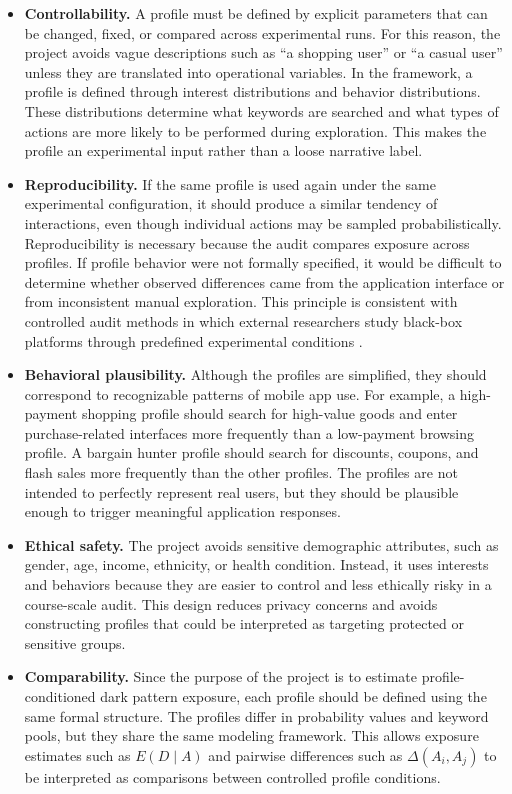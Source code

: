 \begin{itemize}
    \item \textbf{Controllability.} A profile must be defined by explicit parameters that can be changed, fixed, or compared across experimental runs. For this reason, the project avoids vague descriptions such as ``a shopping user'' or ``a casual user'' unless they are translated into operational variables. In the framework, a profile is defined through interest distributions and behavior distributions. These distributions determine what keywords are searched and what types of actions are more likely to be performed during exploration. This makes the profile an experimental input rather than a loose narrative label.

    \item \textbf{Reproducibility.} If the same profile is used again under the same experimental configuration, it should produce a similar tendency of interactions, even though individual actions may be sampled probabilistically. Reproducibility is necessary because the audit compares exposure across profiles. If profile behavior were not formally specified, it would be difficult to determine whether observed differences came from the application interface or from inconsistent manual exploration. This principle is consistent with controlled audit methods in which external researchers study black-box platforms through predefined experimental conditions \cite{sandvig2014auditing,hannak2013personalization}.

    \item \textbf{Behavioral plausibility.} Although the profiles are simplified, they should correspond to recognizable patterns of mobile app use. For example, a high-payment shopping profile should search for high-value goods and enter purchase-related interfaces more frequently than a low-payment browsing profile. A bargain hunter profile should search for discounts, coupons, and flash sales more frequently than the other profiles. The profiles are not intended to perfectly represent real users, but they should be plausible enough to trigger meaningful application responses.

    \item \textbf{Ethical safety.} The project avoids sensitive demographic attributes, such as gender, age, income, ethnicity, or health condition. Instead, it uses interests and behaviors because they are easier to control and less ethically risky in a course-scale audit. This design reduces privacy concerns and avoids constructing profiles that could be interpreted as targeting protected or sensitive groups.

    \item \textbf{Comparability.} Since the purpose of the project is to estimate profile-conditioned dark pattern exposure, each profile should be defined using the same formal structure. The profiles differ in probability values and keyword pools, but they share the same modeling framework. This allows exposure estimates such as \(E(D \mid A)\) and pairwise differences such as \(\Delta(A_i,A_j)\) to be interpreted as comparisons between controlled profile conditions.
\end{itemize}

